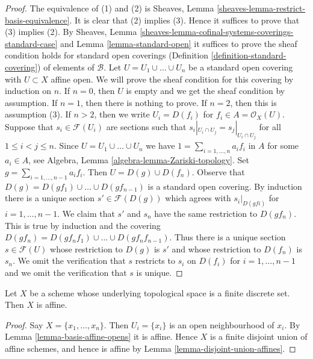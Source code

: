 \begin{proof}
The equivalence of (1) and (2) is
Sheaves, Lemma \ref{sheaves-lemma-restrict-basis-equivalence}.
It is clear that (2) implies (3).
Hence it suffices to prove that (3) implies (2). By
Sheaves, Lemma \ref{sheaves-lemma-cofinal-systems-coverings-standard-case}
and Lemma \ref{lemma-standard-open} it suffices to prove the sheaf
condition holds for standard open coverings
(Definition \ref{definition-standard-covering})
of elements of $\mathcal{B}$.
Let $U = U_1 \cup \ldots \cup U_n$ be a standard open covering
with $U \subset X$ affine open.
We will prove the sheaf condition
for this covering by induction on $n$.
If $n = 0$, then $U$ is empty and we get the sheaf condition
by assumption. If $n = 1$, then there is nothing to prove.
If $n = 2$, then this is assumption (3).
If $n > 2$, then we write $U_i = D(f_i)$ for $f_i \in A = \mathcal{O}_X(U)$.
Suppose that $s_i \in \mathcal{F}(U_i)$ are sections such that
$s_i|_{U_i \cap U_j} = s_j|_{U_i \cap U_j}$ for all $1 \leq i < j \leq n$.
Since $U = U_1 \cup \ldots \cup U_n$ we have
$1 = \sum_{i = 1, \ldots, n} a_i f_i$ in $A$ for some $a_i \in A$, see
Algebra, Lemma \ref{algebra-lemma-Zariski-topology}.
Set $g = \sum_{i = 1, \ldots, n - 1} a_if_i$.
Then $U = D(g) \cup D(f_n)$.
Observe that $D(g) = D(gf_1) \cup \ldots \cup D(gf_{n - 1})$
is a standard open covering. By induction there is a unique section
$s' \in \mathcal{F}(D(g))$ which agrees with
$s_i|_{D(gfi)}$ for $i = 1, \ldots, n - 1$.
We claim that $s'$ and $s_n$ have the same restriction to
$D(gf_n)$. This is true by induction and the covering
$D(gf_n) = D(gf_nf_1) \cup \ldots \cup D(gf_nf_{n - 1})$.
Thus there is a unique section $s \in \mathcal{F}(U)$
whose restriction to $D(g)$ is $s'$ and whose restriction
to $D(f_n)$ is $s_n$. We omit the verification that $s$
restricts to $s_i$ on $D(f_i)$ for $i = 1, \ldots, n - 1$
and we omit the verification that $s$ is unique.
\end{proof}

\begin{lemma}
\label{lemma-scheme-finite-discrete-affine}
Let $X$ be a scheme whose underlying topological space
is a finite discrete set.
Then $X$ is affine.
\end{lemma}

\begin{proof}
Say $X = \{x_1, \ldots, x_n\}$. Then $U_i = \{x_i\}$ is an open neighbourhood
of $x_i$. By
Lemma \ref{lemma-basis-affine-opens}
it is affine. Hence $X$ is a finite disjoint union of affine schemes, and
hence is affine by
Lemma \ref{lemma-disjoint-union-affines}.
\end{proof}

